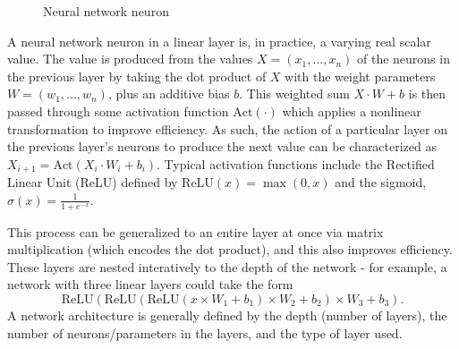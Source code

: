 \documentclass[12pt]{article}
\begin{document}
\begin{figure}[H]
	\centering
	\caption{Neural network neuron}
	\label{fig:neuron}
\end{figure}

A neural network neuron in a linear layer is, in practice, a varying real scalar value. The value is produced from the values $X = (x_1, ..., x_n)$ of the neurons in the previous layer by taking the dot product of $X$ with the weight parameters $W = (w_1, ..., w_n)$, plus an additive bias $b$. This weighted sum $X \cdot W + b$ is then passed through some activation function $\text{Act}(\cdot)$ which applies a nonlinear transformation to improve efficiency. As such, the action of a particular layer on the previous layer's neurons to produce the next value can be characterized as $X_{i+1} = \text{Act}(X_{i} \cdot W_{i} + b_{i})$. Typical activation functions include the Rectified Linear Unit (ReLU) defined by $\text{ReLU}(x) = \max (0, x)$ and the sigmoid, $\sigma(x) = \frac{1}{1 + e^{-x}}$.

This process can be generalized to an entire layer at once via matrix multiplication (which encodes the dot product), and this also improves efficiency. These layers are nested interatively to the depth of the network - for example, a network with three linear layers could take the form
$$
	\text{ReLU}(\text{ReLU}(\text{ReLU}(x \times W_1 + b_1) \times W_2 + b_2) \times W_3 + b_3).
$$
A network architecture is generally defined by the depth (number of layers), the number of neurons/parameters in the layers, and the type of layer used. 
\end{document}
